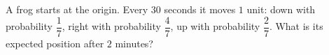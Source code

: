 A frog starts at the origin. Every $30$ seconds it moves $1$ unit: down with probability $\dfrac17$, right with probability $\dfrac47$, up with probability $\dfrac27$. What is its expected position after $2$ minutes?

